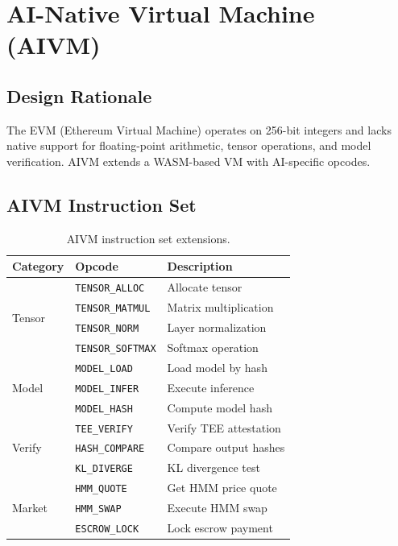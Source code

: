 \section{AI-Native Virtual Machine (AIVM)}

\label{sec:aivm}

\subsection{Design Rationale}

The EVM (Ethereum Virtual Machine) operates on 256-bit integers and lacks native support for floating-point arithmetic, tensor operations, and model verification. AIVM extends a WASM-based VM with AI-specific opcodes.

\subsection{AIVM Instruction Set}

\begin{table}[H]
\centering
\small
\begin{tabular}{lll}
\toprule
\textbf{Category} & \textbf{Opcode} & \textbf{Description} \\
\midrule
\multirow{4}{*}{Tensor} & \texttt{TENSOR\_ALLOC} & Allocate tensor \\
& \texttt{TENSOR\_MATMUL} & Matrix multiplication \\
& \texttt{TENSOR\_NORM} & Layer normalization \\
& \texttt{TENSOR\_SOFTMAX} & Softmax operation \\
\midrule
\multirow{3}{*}{Model} & \texttt{MODEL\_LOAD} & Load model by hash \\
& \texttt{MODEL\_INFER} & Execute inference \\
& \texttt{MODEL\_HASH} & Compute model hash \\
\midrule
\multirow{3}{*}{Verify} & \texttt{TEE\_VERIFY} & Verify TEE attestation \\
& \texttt{HASH\_COMPARE} & Compare output hashes \\
& \texttt{KL\_DIVERGE} & KL divergence test \\
\midrule
\multirow{3}{*}{Market} & \texttt{HMM\_QUOTE} & Get HMM price quote \\
& \texttt{HMM\_SWAP} & Execute HMM swap \\
& \texttt{ESCROW\_LOCK} & Lock escrow payment \\
\bottomrule
\end{tabular}
\caption{AIVM instruction set extensions.}
\label{tab:opcodes}
\end{table}

